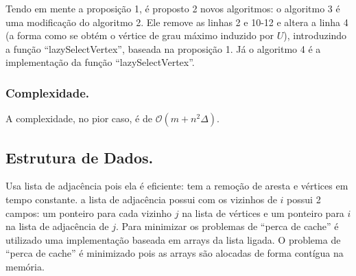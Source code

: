 \documentclass[a4paper,12pt]{article}
\begin{document}

Tendo em mente a proposição 1, é proposto 2 novos algoritmos: o algoritmo 3 é uma modificação do algoritmo 2. Ele remove as linhas 2 e 10-12 e altera a linha 4 (a forma como se obtém o vértice de grau máximo induzido por $U$), introduzindo a função ``lazySelectVertex'', baseada na proposição 1. Já o algoritmo 4 é a implementação da função ``lazySelectVertex''.

\subsubsection{Complexidade.}


A complexidade, no pior caso, é de $\mathcal{O}(m + n^2\Delta)$.

\subsection{Estrutura de Dados.}


Usa lista de adjacência pois ela é eficiente: tem a remoção de aresta e vértices em tempo constante. a lista de adjacência possui com os vizinhos de $i$ possui 2 campos: um ponteiro para cada vizinho $j$ na lista de vértices e um ponteiro para $i$ na lista de adjacência de $j$. Para minimizar os problemas de ``perca de cache'' é utilizado uma implementação baseada em arrays da lista ligada. O problema de ``perca de cache'' é minimizado pois as arrays são alocadas de forma contígua na memória.




\nocite{*}


\end{document}
